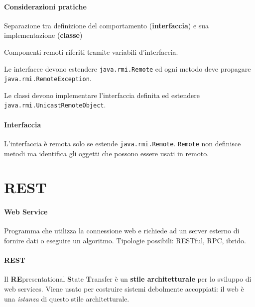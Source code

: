 \documentclass[10pt]{article}
\begin{document}
\paragraph{Considerazioni pratiche}
\begin{list}{}{}
	\item Separazione tra definizione del comportamento (\textbf{interfaccia}) e sua implementazione (\textbf{classe})
	\item Componenti remoti riferiti tramite variabili d'interfaccia.
	\item Le interfacce devono estendere \texttt{java.rmi.Remote} ed ogni metodo deve propagare \texttt{java.rmi.RemoteException}.
	\item Le classi devono implementare l'interfaccia definita ed estendere \texttt{java.rmi.UnicastRemoteObject}.
\end{list}
\paragraph{Interfaccia} L'interfaccia è remota solo se estende \texttt{java.rmi.Remote}.
\texttt{Remote} non definisce metodi ma identifica gli oggetti che possono essere usati in remoto.
\section{REST}
\paragraph{Web Service} Programma che utilizza la connessione web e richiede ad un server esterno di fornire dati o eseguire un algoritmo. Tipologie possibili: RESTful, RPC, ibrido.
\paragraph{REST} Il \textbf{RE}presentational \textbf{S}tate \textbf{T}ransfer è un \textbf{stile architetturale} per lo sviluppo di web services. Viene usato per costruire sistemi debolmente accoppiati: il web è una \textit{istanza} di questo stile architetturale.
\end{document}
